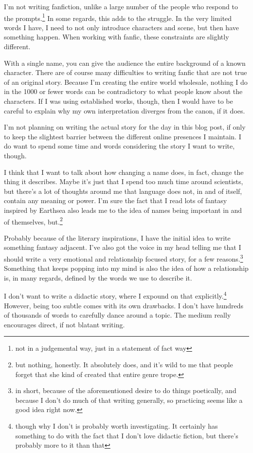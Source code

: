 \documentclass[12pt]{article}[titlepage]
\newcommand{\1}{\={a}}
\newcommand{\2}{\={e}}
\newcommand{\3}{\={\i}}
\newcommand{\4}{\=o}
\newcommand{\5}{\=u}
\newcommand{\6}{\={A}}
\renewcommand{\,}{\textsuperscript{,}}
\begin{document}
I'm not writing fanfiction, unlike a large number of the people who respond to the prompts.\footnote{not in a judgemental way, just in a statement of fact way}
In some regards, this adds to the struggle.
In the very limited words I have, I need to not only introduce characters and scene, but then have something happen.
When working with fanfic, these constraints are slightly different.

With a single name, you can give the audience the entire background of a known character.
There are of course many difficulties to writing fanfic that are not true of an original story.
Because I'm creating the entire world wholesale, nothing I do in the 1000 or fewer words can be contradictory to what people know about the characters.
If I was using established works, though, then I would have to be careful to explain why my own interpretation diverges from the canon, if it does.

I'm not planning on writing the actual story for the day in this blog post, if only to keep the slightest barrier between the different online presences I maintain.
I do want to spend some time and words considering the story I want to write, though.

I think that I want to talk about how changing a name does, in fact, change the thing it describes.
Maybe it's just that I spend too much time around scientists, but there's a lot of thoughts around me that language does not, in and of itself, contain any meaning or power.
I'm sure the fact that I read lots of fantasy inspired by Earthsea also leads me to the idea of names being important in and of themselves, but.\footnote{but nothing, honestly.
It absolutely does, and it's wild to me that people forget that she kind of created that entire genre trope.}

Probably because of the literary inspirations, I have the initial idea to write something fantasy adjacent.
I've also got the voice in my head telling me that I should write a very emotional and relationship focused story, for a few reasons.\footnote{in short, because of the aforementioned desire to do things poetically, and because I don't do much of that writing generally, so practicing seems like a good idea right now.}
Something that keeps popping into my mind is also the idea of how a relationship is, in many regards, defined by the words we use to describe it.

I don't want to write a didactic story, where I expound on that explicitly.\footnote{though why I don't is probably worth investigating.
It certainly has something to do with the fact that I don't love didactic fiction, but there's probably more to it than that}
However, being too subtle comes with its own drawbacks.
I don't have hundreds of thousands of words to carefully dance around a topic.
The medium really encourages direct, if not blatant writing.
\end{document}
